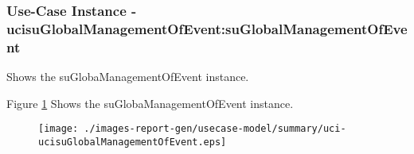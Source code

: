 
	\subsubsection{Use-Case Instance - ucisuGlobalManagementOfEvent:suGlobalManagementOfEvent}
	
	Shows the suGlobaManagementOfEvent instance.		  
	\begin{operationmodel}
	
	\end{operationmodel} 

	
	Figure \ref{fig:lu.uni.lassy.excalibur.group09.spec-RE-UC-uci-ucisuGlobalManagementOfEvent}
	Shows the suGlobaManagementOfEvent instance.
	
	\begin{figure}[htbp]
	\begin{center}
	
	\texttt{[image: ./images-report-gen/usecase-model/summary/uci-ucisuGlobalManagementOfEvent.eps]}
	\end{center}
	\caption[lu.uni.lassy.excalibur.group09.spec Sequence Diagram: uci-ucisuGlobalManagementOfEvent]{}
	\label{fig:lu.uni.lassy.excalibur.group09.spec-RE-UC-uci-ucisuGlobalManagementOfEvent}
	\end{figure}
	\vspace{0.5cm}
